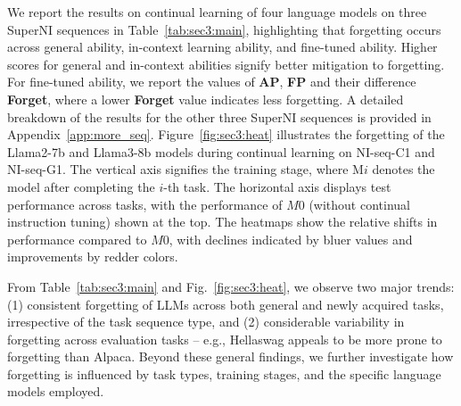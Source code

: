 We report the results on continual learning of four language models on three SuperNI sequences in Table~\ref{tab:sec3:main}, highlighting that forgetting occurs across general ability, in-context learning ability, and fine-tuned ability. 
Higher scores for general and in-context abilities signify better mitigation to forgetting. For fine-tuned ability, we report the values of \textbf{AP}, \textbf{FP} and their difference \textbf{Forget}, where a lower \textbf{Forget} value indicates less forgetting. A detailed breakdown of the results for the other three SuperNI sequences is provided in Appendix~\ref{app:more_seq}.
Figure~\ref{fig:sec3:heat} illustrates the forgetting of the Llama2-7b and Llama3-8b models during continual learning on NI-seq-C1 and NI-seq-G1. The vertical axis signifies the training stage, where M$i$ denotes the model after completing the $i$-th task. The horizontal axis displays test performance across tasks, with the performance of $M$0 (without continual instruction tuning) shown at the top. The heatmaps show the relative shifts in performance compared to $M$0,
with declines indicated by bluer values and improvements by redder colors.

From Table~\ref{tab:sec3:main} and Fig.~\ref{fig:sec3:heat}, we observe two major trends: (1) consistent forgetting of LLMs across both general and newly acquired tasks, irrespective of the task sequence type, and (2) considerable variability in forgetting across evaluation tasks -- e.g., Hellaswag appeals to be more prone to forgetting than Alpaca.
Beyond these general findings, we further investigate how forgetting is influenced by task types, training stages, and the specific language models employed. 




